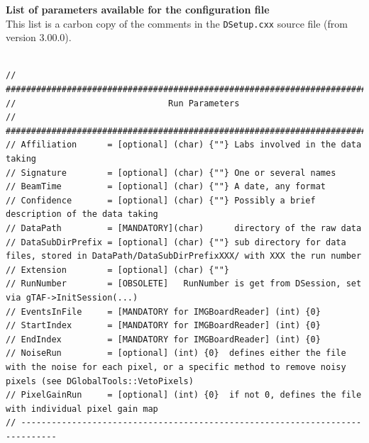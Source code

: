 \documentclass[a4paper, 12pt, twoside]{article}
\begin{document}
\noindent
{\bf List of parameters available for the configuration file}\\

\noindent
This list is a carbon copy of the comments in the {\tt DSetup.cxx} source file (from version 3.00.0).

\begin{verbatim}

// #############################################################################
//                              Run Parameters
// #############################################################################
// Affiliation      = [optional] (char) {""} Labs involved in the data taking
// Signature        = [optional] (char) {""} One or several names
// BeamTime         = [optional] (char) {""} A date, any format
// Confidence       = [optional] (char) {""} Possibly a brief description of the data taking
// DataPath         = [MANDATORY](char)      directory of the raw data
// DataSubDirPrefix = [optional] (char) {""} sub directory for data files, stored in DataPath/DataSubDirPrefixXXX/ with XXX the run number
// Extension        = [optional] (char) {""}
// RunNumber        = [OBSOLETE]   RunNumber is get from DSession, set via gTAF->InitSession(...)
// EventsInFile     = [MANDATORY for IMGBoardReader] (int) {0}
// StartIndex       = [MANDATORY for IMGBoardReader] (int) {0}
// EndIndex         = [MANDATORY for IMGBoardReader] (int) {0}
// NoiseRun         = [optional] (int) {0}  defines either the file with the noise for each pixel, or a specific method to remove noisy pixels (see DGlobalTools::VetoPixels)
// PixelGainRun     = [optional] (int) {0}  if not 0, defines the file with individual pixel gain map
// -----------------------------------------------------------------------------



\end{verbatim}
\end{document}
